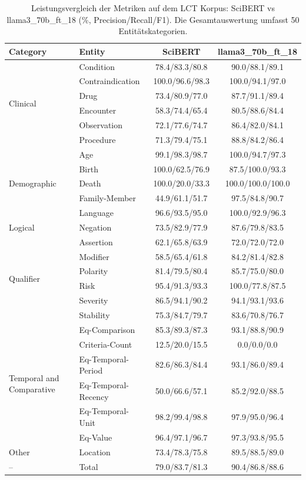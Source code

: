 
\begin{table}[htbp]
\centering
\begin{tabular}{llcc}
\toprule
\textbf{Category} & \textbf{Entity} & \textbf{SciBERT} & \textbf{llama3_70b_ft_18} \\
\midrule
\multirow{6}{*}{Clinical} & Condition & 78.4/83.3/80.8 & 90.0/88.1/89.1 \\
 & Contraindication & 100.0/96.6/98.3 & 100.0/94.1/97.0 \\
 & Drug & 73.4/80.9/77.0 & 87.7/91.1/89.4 \\
 & Encounter & 58.3/74.4/65.4 & 80.5/88.6/84.4 \\
 & Observation & 72.1/77.6/74.7 & 86.4/82.0/84.1 \\
 & Procedure & 71.3/79.4/75.1 & 88.8/84.2/86.4 \\
\midrule
\multirow{5}{*}{Demographic} & Age & 99.1/98.3/98.7 & 100.0/94.7/97.3 \\
 & Birth & 100.0/62.5/76.9 & 87.5/100.0/93.3 \\
 & Death & 100.0/20.0/33.3 & 100.0/100.0/100.0 \\
 & Family-Member & 44.9/61.1/51.7 & 97.5/84.8/90.7 \\
 & Language & 96.6/93.5/95.0 & 100.0/92.9/96.3 \\
\midrule
Logical & Negation & 73.5/82.9/77.9 & 87.6/79.8/83.5 \\
\midrule
\multirow{6}{*}{Qualifier} & Assertion & 62.1/65.8/63.9 & 72.0/72.0/72.0 \\
 & Modifier & 58.5/65.4/61.8 & 84.2/81.4/82.8 \\
 & Polarity & 81.4/79.5/80.4 & 85.7/75.0/80.0 \\
 & Risk & 95.4/91.3/93.3 & 100.0/77.8/87.5 \\
 & Severity & 86.5/94.1/90.2 & 94.1/93.1/93.6 \\
 & Stability & 75.3/84.7/79.7 & 83.6/70.8/76.7 \\
\midrule
\multirow{6}{*}{Temporal and Comparative} & Eq-Comparison & 85.3/89.3/87.3 & 93.1/88.8/90.9 \\
 & Criteria-Count & 12.5/20.0/15.5 & 0.0/0.0/0.0 \\
 & Eq-Temporal-Period & 82.6/86.3/84.4 & 93.1/86.0/89.4 \\
 & Eq-Temporal-Recency & 50.0/66.6/57.1 & 85.2/92.0/88.5 \\
 & Eq-Temporal-Unit & 98.2/99.4/98.8 & 97.9/95.0/96.4 \\
 & Eq-Value & 96.4/97.1/96.7 & 97.3/93.8/95.5 \\
\midrule
Other & Location & 73.4/78.3/75.8 & 89.5/88.5/89.0 \\
\midrule
-- & Total & 79.0/83.7/81.3 & 90.4/86.8/88.6 \\
\bottomrule
\end{tabular}
\caption{Leistungsvergleich der Metriken auf dem LCT Korpus: SciBERT vs llama3_70b_ft_18 (\%, Precision/Recall/F1). Die Gesamtauswertung umfasst 50 Entitätskategorien.}
\label{tab:metrics_comparison}
\end{table}
    